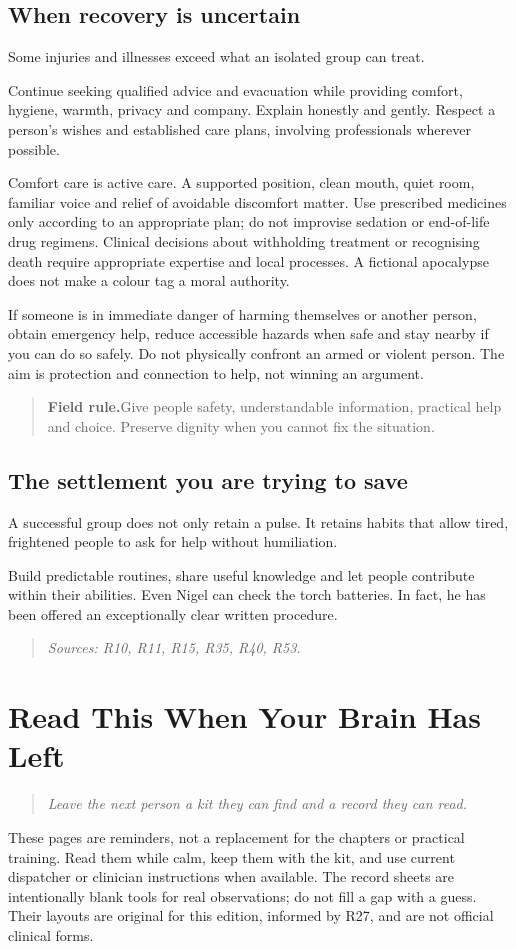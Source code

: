 \documentclass[10pt,openright]{book}
\newcommand{\fieldrule}[1]{\begin{quote}\textbf{Field rule.}\enspace #1\end{quote}}
\begin{document}
\section*{When recovery is uncertain}
Some injuries and illnesses exceed what an isolated group can treat.

Continue seeking qualified advice and evacuation while providing comfort, hygiene, warmth, privacy and company. Explain honestly and gently. Respect a person's wishes and established care plans, involving professionals wherever possible.

Comfort care is active care. A supported position, clean mouth, quiet room, familiar voice and relief of avoidable discomfort matter. Use prescribed medicines only according to an appropriate plan; do not improvise sedation or end-of-life drug regimens. Clinical decisions about withholding treatment or recognising death require appropriate expertise and local processes. A fictional apocalypse does not make a colour tag a moral authority.

If someone is in immediate danger of harming themselves or another person, obtain emergency help, reduce accessible hazards when safe and stay nearby if you can do so safely. Do not physically confront an armed or violent person. The aim is protection and connection to help, not winning an argument.

\fieldrule{Give people safety, understandable information, practical help and choice. Preserve dignity when you cannot fix the situation.}
\section*{The settlement you are trying to save}
A successful group does not only retain a pulse. It retains habits that allow tired, frightened people to ask for help without humiliation.

Build predictable routines, share useful knowledge and let people contribute within their abilities. Even Nigel can check the torch batteries. In fact, he has been offered an exceptionally clear written procedure.

\begin{quote}\emph{Sources: R10, R11, R15, R35, R40, R53.}\end{quote}

\chapter{Read This When Your Brain Has Left}
\begin{quote}\emph{Leave the next person a kit they can find and a record they can read.}\end{quote}
These pages are reminders, not a replacement for the chapters or practical training. Read them while calm, keep them with the kit, and use current dispatcher or clinician instructions when available. The record sheets are intentionally blank tools for real observations; do not fill a gap with a guess. Their layouts are original for this edition, informed by R27, and are not official clinical forms.
\end{document}
